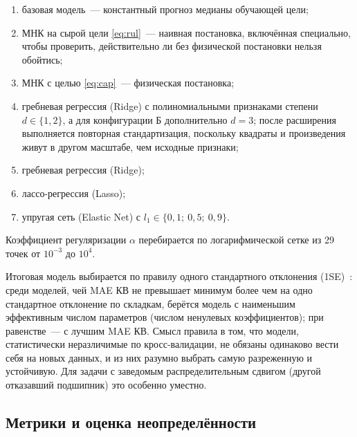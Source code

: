 \documentclass[14pt,a4paper]{extarticle}
\begin{document}
\begin{enumerate}
  \item базовая модель~--- константный прогноз медианы обучающей цели;
  \item МНК на сырой цели \eqref{eq:rul}~--- наивная постановка, включённая
  специально, чтобы проверить, действительно ли без физической постановки
  нельзя обойтись;
  \item МНК с целью \eqref{eq:cap}~--- физическая постановка;
  \item гребневая регрессия (Ridge) с полиномиальными признаками степени
  $d \in \{1,2\}$, а для конфигурации Б дополнительно $d=3$; после расширения
  выполняется повторная стандартизация, поскольку квадраты и произведения
  живут в другом масштабе, чем исходные признаки;
  \item гребневая регрессия (Ridge);
  \item лассо-регрессия (Lasso);
  \item упругая сеть (Elastic Net) с $l_1 \in \{0{,}1;\ 0{,}5;\ 0{,}9\}$.
\end{enumerate}

Коэффициент регуляризации $\alpha$ перебирается по логарифмической сетке
из 29 точек от $10^{-3}$ до $10^4$.

Итоговая модель выбирается по правилу одного стандартного отклонения
(1SE)~\cite{hastie}: среди моделей, чей MAE КВ не превышает минимум более чем
на одно стандартное отклонение по складкам, берётся модель с наименьшим
эффективным числом параметров (числом ненулевых коэффициентов); при
равенстве~--- с лучшим MAE КВ. Смысл правила в том, что модели, статистически
неразличимые по кросс-валидации, не обязаны одинаково вести себя на новых
данных, и из них разумно выбрать самую разреженную и устойчивую. Для задачи
с заведомым распределительным сдвигом (другой отказавший подшипник) это
особенно уместно.

\subsection{Метрики и оценка неопределённости}
\end{document}
